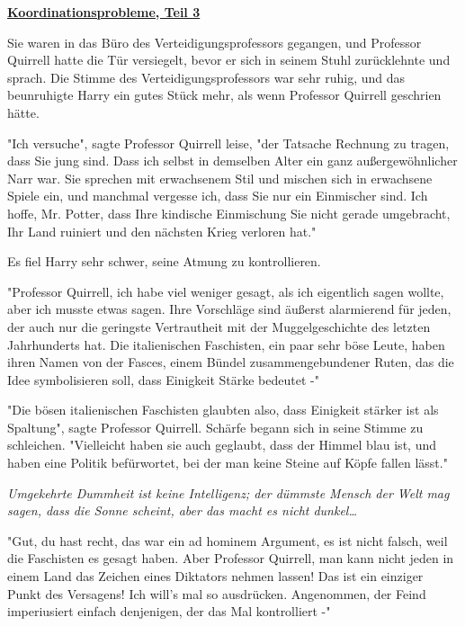 

\hypertarget{koordinationsprobleme-teil-3}{%

\textbf{\uline{Koordinationsprobleme, Teil 3}}

Sie waren in das Büro des Verteidigungsprofessors gegangen, und Professor Quirrell hatte die Tür versiegelt, bevor er sich in seinem Stuhl zurücklehnte und sprach. Die Stimme des Verteidigungsprofessors war sehr ruhig, und das beunruhigte Harry ein gutes Stück mehr, als wenn Professor Quirrell geschrien hätte.

"Ich versuche", sagte Professor Quirrell leise, "der Tatsache Rechnung zu tragen, dass Sie jung sind. Dass ich selbst in demselben Alter ein ganz außergewöhnlicher Narr war. Sie sprechen mit erwachsenem Stil und mischen sich in erwachsene Spiele ein, und manchmal vergesse ich, dass Sie nur ein Einmischer sind. Ich hoffe, Mr. Potter, dass Ihre kindische Einmischung Sie nicht gerade umgebracht, Ihr Land ruiniert und den nächsten Krieg verloren hat."

Es fiel Harry sehr schwer, seine Atmung zu kontrollieren.

"Professor Quirrell, ich habe viel weniger gesagt, als ich eigentlich sagen wollte, aber ich musste etwas sagen. Ihre Vorschläge sind äußerst alarmierend für jeden, der auch nur die geringste Vertrautheit mit der Muggelgeschichte des letzten Jahrhunderts hat. Die italienischen Faschisten, ein paar sehr böse Leute, haben ihren Namen von der Fasces, einem Bündel zusammengebundener Ruten, das die Idee symbolisieren soll, dass Einigkeit Stärke bedeutet -"

"Die bösen italienischen Faschisten glaubten also, dass Einigkeit stärker ist als Spaltung", sagte Professor Quirrell. Schärfe begann sich in seine Stimme zu schleichen. "Vielleicht haben sie auch geglaubt, dass der Himmel blau ist, und haben eine Politik befürwortet, bei der man keine Steine auf Köpfe fallen lässt."

\emph{Umgekehrte Dummheit ist keine Intelligenz; der dümmste Mensch der Welt mag sagen, dass die Sonne scheint, aber das macht es nicht dunkel…}

"Gut, du hast recht, das war ein ad hominem Argument, es ist nicht falsch, weil die Faschisten es gesagt haben. Aber Professor Quirrell, man kann nicht jeden in einem Land das Zeichen eines Diktators nehmen lassen! Das ist ein einziger Punkt des Versagens! Ich will's mal so ausdrücken. Angenommen, der Feind imperiusiert einfach denjenigen, der das Mal kontrolliert -"

}
